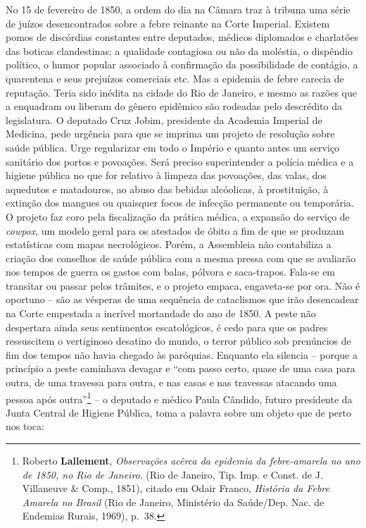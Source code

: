 No 15 de fevereiro de 1850, a ordem do dia na Câmara traz à tribuna uma
série de juízos desencontrados sobre a febre reinante na Corte Imperial.
Existem pomos de discórdias constantes entre deputados, médicos
diplomados e charlatões das boticas clandestinas: a qualidade contagiosa
ou não da moléstia, o dispêndio político, o humor popular associado à
confirmação da possibilidade de contágio, a quarentena e seus prejuízos
comerciais etc. Mas a epidemia de febre carecia de reputação. Teria sido
inédita na cidade do Rio de Janeiro, e mesmo as razões que a enquadram
ou liberam do gênero epidêmico são rodeadas pelo descrédito da
legislatura. O deputado Cruz Jobim, presidente da Academia Imperial de
Medicina, pede urgência para que se imprima um projeto de resolução
sobre saúde pública. Urge regularizar em todo o Império e quanto antes
um serviço sanitário dos portos e povoações. Será preciso superintender
a polícia médica e a higiene pública no que for relativo à limpeza das
povoações, das valas, dos aquedutos e matadouros, ao abuso das bebidas
alcóolicas, à prostituição, à extinção dos mangues ou quaisquer focos de
infecção permanente ou temporária. O projeto faz coro pela fiscalização
da prática médica, a expansão do serviço de \emph{cowpox}, um modelo
geral para os atestados de óbito a fim de que se produzam estatísticas
com mapas necrológicos. Porém, a Assembleia não contabiliza a criação
dos conselhos de saúde pública com a mesma pressa com que se avaliarão
nos tempos de guerra os gastos com balas, pólvora e saca-trapos. Fala-se
em transitar ou passar pelos trâmites, e o projeto empaca, engaveta-se
por ora. Não é oportuno -- são as vésperas de uma sequência de
cataclismos que irão desencadear na Corte empestada a incrível
mortandade do ano de 1850. A peste não despertara ainda seus sentimentos
escatológicos, é cedo para que os padres ressuscitem o vertiginoso
desatino do mundo, o terror público sob prenúncios de fim dos tempos não
havia chegado às paróquias. Enquanto ela silencia -- porque a princípio
a peste caminhava devagar e ``com passo certo, quase de uma casa para
outra, de uma travessa para outra, e nas casas e nas travessas atacando
uma pessoa após outra''\footnote{Roberto \textbf{Lallement},
  \emph{Observações acêrca da epidemia da febre-amarela no ano de 1850,
  no Rio de Janeiro}. (Rio de Janeiro, Tip. Imp. e Const. de J.
  Villaneuve \& Comp., 1851), citado em Odair Franco, \emph{História da
  Febre Amarela no Brasil} (Rio de Janeiro, Ministério da Saúde/Dep.
  Nac. de Endemias Rurais, 1969), p.~38.} -- o deputado e médico Paula
Cândido, futuro presidente da Junta Central de Higiene Pública, toma a
palavra sobre um objeto que de perto nos toca:

